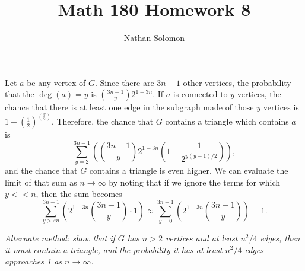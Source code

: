 \documentclass[12pt]{article}
\begin{document}
\title{Math 180 Homework 8}
\author{Nathan Solomon}
\maketitle

\section{}
\noindent{}\bigskip\par
Let $a$ be any vertex of $G$. Since there are $3n-1$ other vertices, the probability that the $ \operatorname{deg}(a) = y$ is $\binom{3n-1}{y}2^{1-3n}$.
If $a$ is connected to $y$ vertices, the chance that there is at least one edge in the subgraph made of those $y$ vertices is $1-( \frac{1}{2})^{\binom{y}{2}}$.
Therefore, the chance that $G$ contains a triangle which contains $a$ is
\[ \sum_{y=2}^{3n-1} \left( \binom{3n-1}{y} 2^{1-3n} \left( 1- \frac{1}{2^{y(y-1)/2}} \right)  \right), \]
and the chance that $G$ contains a triangle is even higher. We can evaluate the limit of that sum as $n \rightarrow \infty$ by noting that if we ignore the terms for which $y << n$, then the sum becomes
\[ \sum_{y > \varepsilon n}^{3n-1} \left( 2^{1-3n} \binom{3n-1}{y} \cdot 1 \right) \approx \sum_{y=0}^{3n-1} \left( 2^{1-3n} \binom{3n-1}{y} \right) = 1. \]
\par
\textit{Alternate method: show that if $G$ has $n>2$ vertices and at least $n^2/4$ edges, then it must contain a triangle, and the probability it has at least $n^2/4$ edges approaches 1 as $n \rightarrow \infty$.}
\end{document}
